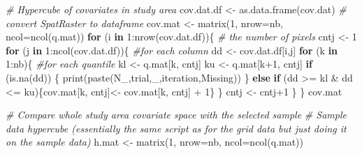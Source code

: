 \documentclass[
  10pt,
  b5paper,
  oneside]{book}
\newenvironment{Shaded}{\begin{snugshade}}{\end{snugshade}}
\newcommand{\AttributeTok}[1]{\textcolor[rgb]{0.77,0.63,0.00}{#1}}
\newcommand{\CommentTok}[1]{\textcolor[rgb]{0.56,0.35,0.01}{\textit{#1}}}
\newcommand{\ControlFlowTok}[1]{\textcolor[rgb]{0.13,0.29,0.53}{\textbf{#1}}}
\newcommand{\DecValTok}[1]{\textcolor[rgb]{0.00,0.00,0.81}{#1}}
\newcommand{\FunctionTok}[1]{\textcolor[rgb]{0.00,0.00,0.00}{#1}}
\newcommand{\NormalTok}[1]{#1}
\newcommand{\OtherTok}[1]{\textcolor[rgb]{0.56,0.35,0.01}{#1}}
\newcommand{\SpecialCharTok}[1]{\textcolor[rgb]{0.00,0.00,0.00}{#1}}
\newcommand{\StringTok}[1]{\textcolor[rgb]{0.31,0.60,0.02}{#1}}
\begin{document}
\begin{Shaded}
\begin{Highlighting}[]
    \CommentTok{\# Hypercube of covariates in study area}
\NormalTok{    cov.dat.df }\OtherTok{\textless{}{-}} \FunctionTok{as.data.frame}\NormalTok{(cov.dat) }\CommentTok{\# convert SpatRaster to dataframe}
\NormalTok{    cov.mat }\OtherTok{\textless{}{-}} \FunctionTok{matrix}\NormalTok{(}\DecValTok{1}\NormalTok{, }\AttributeTok{nrow=}\NormalTok{nb, }\AttributeTok{ncol=}\FunctionTok{ncol}\NormalTok{(q.mat))}
    \ControlFlowTok{for}\NormalTok{ (i }\ControlFlowTok{in} \DecValTok{1}\SpecialCharTok{:}\FunctionTok{nrow}\NormalTok{(cov.dat.df))\{ }\CommentTok{\# the number of pixels}
\NormalTok{      cntj }\OtherTok{\textless{}{-}} \DecValTok{1} 
      \ControlFlowTok{for}\NormalTok{ (j }\ControlFlowTok{in} \DecValTok{1}\SpecialCharTok{:}\FunctionTok{ncol}\NormalTok{(cov.dat.df))\{ }\CommentTok{\#for each column}
\NormalTok{        dd }\OtherTok{\textless{}{-}}\NormalTok{ cov.dat.df[i,j]  }
        \ControlFlowTok{for}\NormalTok{ (k }\ControlFlowTok{in} \DecValTok{1}\SpecialCharTok{:}\NormalTok{nb)\{  }\CommentTok{\#for each quantile}
\NormalTok{          kl }\OtherTok{\textless{}{-}}\NormalTok{ q.mat[k, cntj] }
\NormalTok{          ku }\OtherTok{\textless{}{-}}\NormalTok{ q.mat[k}\SpecialCharTok{+}\DecValTok{1}\NormalTok{, cntj] }
          \ControlFlowTok{if}\NormalTok{ (}\FunctionTok{is.na}\NormalTok{(dd)) \{}
            \FunctionTok{print}\NormalTok{(}\FunctionTok{paste}\NormalTok{(}\StringTok{\textquotesingle{}N\_\textquotesingle{}}\NormalTok{,trial,}\StringTok{\textquotesingle{}\_\textquotesingle{}}\NormalTok{,iteration,}\StringTok{\textquotesingle{}Missing\textquotesingle{}}\NormalTok{))}
\NormalTok{          \}}
          \ControlFlowTok{else} \ControlFlowTok{if}\NormalTok{ (dd }\SpecialCharTok{\textgreater{}=}\NormalTok{ kl }\SpecialCharTok{\&}\NormalTok{ dd }\SpecialCharTok{\textless{}=}\NormalTok{ ku)\{cov.mat[k, cntj]}\OtherTok{\textless{}{-}}\NormalTok{ cov.mat[k, cntj] }\SpecialCharTok{+} \DecValTok{1}\NormalTok{\} }
\NormalTok{        \}}
\NormalTok{        cntj }\OtherTok{\textless{}{-}}\NormalTok{ cntj}\SpecialCharTok{+}\DecValTok{1}
\NormalTok{      \}}
\NormalTok{    \}}
\NormalTok{    cov.mat}

    \CommentTok{\# Compare whole study area covariate space with the selected sample}
    \CommentTok{\# Sample data hypercube (essentially the same script as for the grid data but just doing it on the sample data)}
\NormalTok{    h.mat }\OtherTok{\textless{}{-}} \FunctionTok{matrix}\NormalTok{(}\DecValTok{1}\NormalTok{, }\AttributeTok{nrow=}\NormalTok{nb, }\AttributeTok{ncol=}\FunctionTok{ncol}\NormalTok{(q.mat))}
    

\end{Highlighting}
\end{Shaded}
\end{document}
